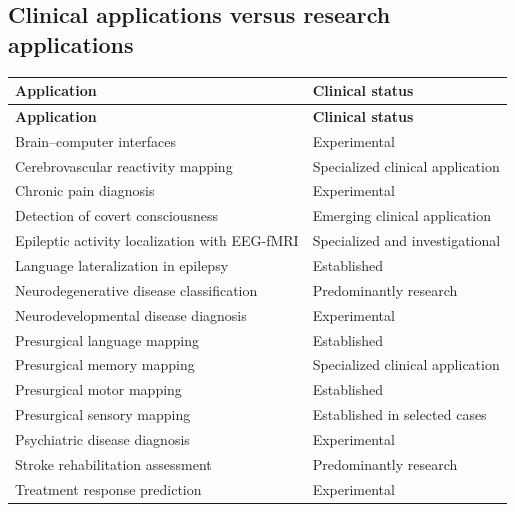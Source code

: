 \subsection{Clinical applications versus research applications}
\begin{longtable}{@{}p{}p{}@{}}
\toprule
\textbf{Application} & \textbf{Clinical status} \\
\midrule
\endfirsthead
\toprule
\textbf{Application} & \textbf{Clinical status} \\
\midrule
\endhead
Brain--computer interfaces & Experimental \\
Cerebrovascular reactivity mapping & Specialized clinical application \\
Chronic pain diagnosis & Experimental \\
Detection of covert consciousness & Emerging clinical application \\
Epileptic activity localization with EEG-fMRI & Specialized and investigational \\
Language lateralization in epilepsy & Established \\
Neurodegenerative disease classification & Predominantly research \\
Neurodevelopmental disease diagnosis & Experimental \\
Presurgical language mapping & Established \\
Presurgical memory mapping & Specialized clinical application \\
Presurgical motor mapping & Established \\
Presurgical sensory mapping & Established in selected cases \\
Psychiatric disease diagnosis & Experimental \\
Stroke rehabilitation assessment & Predominantly research \\
Treatment response prediction & Experimental \\
\bottomrule
\end{longtable}

